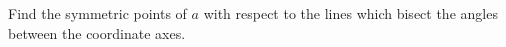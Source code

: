 Find the symmetric points of $a$ with respect to the lines which bisect the angles between the
coordinate axes.\\

\begin{solution}\renewcommand{\qedsymbol}{}\ \\

    

\end{solution}
